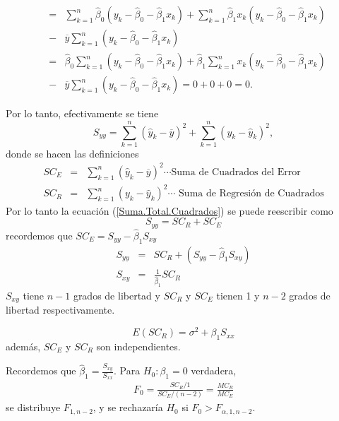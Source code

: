 \begin{eqnarray*}
&=&\sum_{k=1}^{n}\hat{\beta}_{0}\left(y_{k}-\hat{\beta}_{0}-\hat{\beta}_{1}x_{k}\right)+\sum_{k=1}^{n}\hat{\beta}_{1}x_{k}\left(y_{k}-\hat{\beta}_{0}-\hat{\beta}_{1}x_{k}\right)\\
&-&\overline{y}\sum_{k=1}^{n}\left(y_{k}-\hat{\beta}_{0}-\hat{\beta}_{1}x_{k}\right)\\
&=&\hat{\beta}_{0}\sum_{k=1}^{n}\left(y_{k}-\hat{\beta}_{0}-\hat{\beta}_{1}x_{k}\right)+\hat{\beta}_{1}\sum_{k=1}^{n}x_{k}\left(y_{k}-\hat{\beta}_{0}-\hat{\beta}_{1}x_{k}\right)\\
&-&\overline{y}\sum_{k=1}^{n}\left(y_{k}-\hat{\beta}_{0}-\hat{\beta}_{1}x_{k}\right)=0+0+0=0.
\end{eqnarray*}






Por lo tanto, efectivamente se tiene
\begin{equation}\label{Suma.Total.Cuadrados}
S_{yy}=\sum_{k=1}^{n}\left(\hat{y}_{k}-\overline{y}\right)^{2}+\sum_{k=1}^{n}\left(y_{k}-\hat{y}_{k}\right)^{2},
\end{equation}
donde se hacen las definiciones
\begin{eqnarray}
SC_{E}&=&\sum_{k=1}^{n}\left(\hat{y}_{k}-\overline{y}\right)^{2}\cdots\textrm{Suma de Cuadrados del Error}\\
SC_{R}&=&\sum_{k=1}^{n}\left(y_{k}-\hat{y}_{k}\right)^{2}\cdots\textrm{ Suma de Regresi\'on de Cuadrados}
\end{eqnarray}
Por lo tanto la ecuaci\'on (\ref{Suma.Total.Cuadrados}) se puede reescribir como 
\begin{equation}\label{Suma.Total.Cuadrados.Dos}
S_{yy}=SC_{R}+SC_{E}
\end{equation}
recordemos que $SC_{E}=S_{yy}-\hat{\beta}_{1}S_{xy}$
\begin{eqnarray*}
S_{yy}&=&SC_{R}+\left( S_{yy}-\hat{\beta}_{1}S_{xy}\right)\\
S_{xy}&=&\frac{1}{\hat{\beta}_{1}}SC_{R}
\end{eqnarray*}
$S_{xy}$ tiene $n-1$ grados de libertad y $SC_{R}$ y $SC_{E}$ tienen 1 y $n-2$ grados de libertad respectivamente.






\begin{Prop}
\begin{equation}
E\left(SC_{R}\right)=\sigma^{2}+\beta_{1}S_{xx}
\end{equation}
adem\'as, $SC_{E}$ y $SC_{R}$ son independientes.
\end{Prop}
Recordemos que $\hat{\beta}_{1}=\frac{S_{xy}}{S_{xx}}$. Para $H_{0}:\beta_{1}=0$ verdadera,
\begin{eqnarray*}
F_{0}=\frac{SC_{R}/1}{SC_{E}/(n-2)}=\frac{MC_{R}}{MC_{E}}
\end{eqnarray*}
se distribuye $F_{1,n-2}$, y se rechazar\'ia $H_{0}$ si $F_{0}>F_{\alpha,1,n-2}$.

